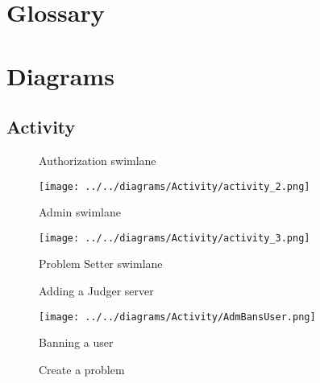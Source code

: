 \appendix
\section{Glossary}
\pagebreak

\vspace*{\fill}
\section{Diagrams}
\vspace*{\fill}
\pagebreak

\vspace*{\fill}
\subsection*{Activity}
\vspace*{\fill}
\pagebreak

\begin{figure}[H]
    \centering
    \caption{Authorization swimlane}
\end{figure}
\pagebreak

\begin{figure}[H]
    \centering
    \texttt{[image: ../../diagrams/Activity/activity\_2.png]}
    \caption{Admin swimlane}
\end{figure}
\pagebreak

\begin{figure}[H]
    \centering
    \texttt{[image: ../../diagrams/Activity/activity\_3.png]}
    \caption{Problem Setter swimlane}
\end{figure}
\pagebreak

\begin{figure}[H]
    \centering
    \caption{Adding a Judger server}
\end{figure}
\pagebreak

\begin{figure}[H]
    \centering
    \texttt{[image: ../../diagrams/Activity/AdmBansUser.png]}
    \caption{Banning a user}
\end{figure}
\pagebreak

\begin{figure}[H]
    \centering
    \caption{Create a problem}
\end{figure}
\pagebreak

